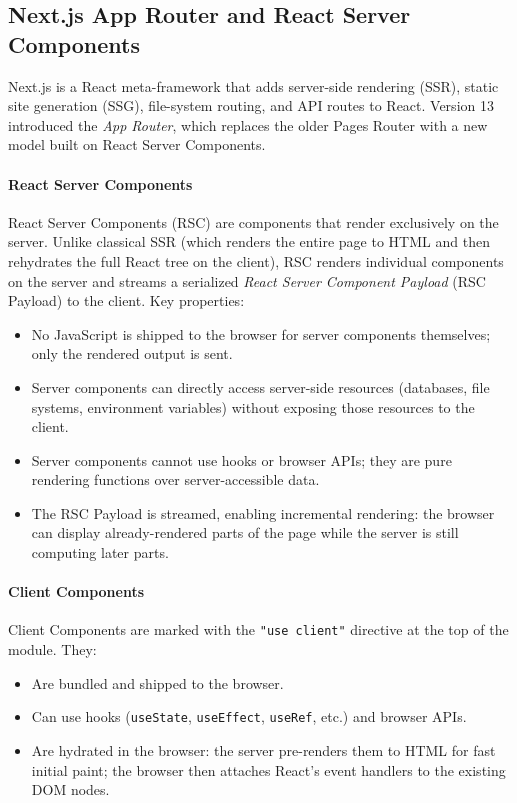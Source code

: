 \subsection{Next.js App Router and React Server Components}

Next.js is a React meta-framework that adds server-side rendering (SSR), static site generation (SSG), file-system routing, and API routes to React. Version 13 introduced the \emph{App Router}, which replaces the older Pages Router with a new model built on React Server Components.

\paragraph{React Server Components}

React Server Components (RSC) are components that render exclusively on the server. Unlike classical SSR (which renders the entire page to HTML and then rehydrates the full React tree on the client), RSC renders individual components on the server and streams a serialized \emph{React Server Component Payload} (RSC Payload) to the client. Key properties:

\begin{itemize}
    \item No JavaScript is shipped to the browser for server components themselves; only the rendered output is sent.
    \item Server components can directly access server-side resources (databases, file systems, environment variables) without exposing those resources to the client.
    \item Server components cannot use hooks or browser APIs; they are pure rendering functions over server-accessible data.
    \item The RSC Payload is streamed, enabling incremental rendering: the browser can display already-rendered parts of the page while the server is still computing later parts.
\end{itemize}

\paragraph{Client Components}

Client Components are marked with the \texttt{"use client"} directive at the top of the module. They:
\begin{itemize}
    \item Are bundled and shipped to the browser.
    \item Can use hooks (\texttt{useState}, \texttt{useEffect}, \texttt{useRef}, etc.) and browser APIs.
    \item Are hydrated in the browser: the server pre-renders them to HTML for fast initial paint; the browser then attaches React's event handlers to the existing DOM nodes.
\end{itemize}

